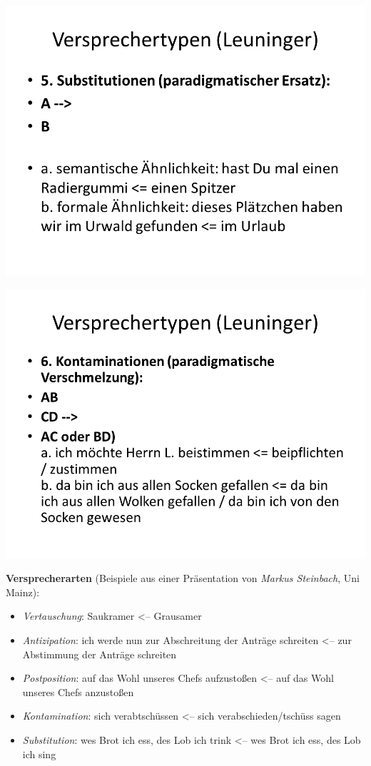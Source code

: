\documentclass[
  letterpaper,
]{scrbook}
\providecommand{\tightlist}{%
  \setlength{\itemsep}{0pt}\setlength{\parskip}{0pt}}\usepackage{longtable,booktabs,array}
\begin{document}
\includegraphics[width=1\textwidth,height=\textheight]{./pictures/Versprechertypen_7.PNG}

\includegraphics[width=1\textwidth,height=\textheight]{./pictures/Versprechertypen_8.PNG}

\textbf{Versprecherarten} (Beispiele aus einer Präsentation von
\emph{Markus Steinbach}, Uni Mainz):

\begin{itemize}
\tightlist
\item
  \emph{Vertauschung}: Saukramer \textless-- Grausamer\\
\item
  \emph{Antizipation}: ich werde nun zur Abschreitung der Anträge
  schreiten \textless-- zur Abstimmung der Anträge schreiten\\
\item
  \emph{Postposition}: auf das Wohl unseres Chefs aufzustoßen
  \textless-- auf das Wohl unseres Chefs anzustoßen\\
\item
  \emph{Kontamination}: sich verabtschüssen \textless-- sich
  verabschieden/tschüss sagen\\
\item
  \emph{Substitution}: wes Brot ich ess, des Lob ich trink \textless--
  wes Brot ich ess, des Lob ich sing\\
\end{itemize}
\end{document}
